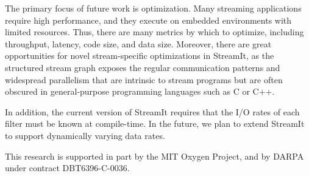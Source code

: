  The primary focus of future work is
optimization.  Many streaming applications require high performance,
and they execute on embedded environments with limited resources.
Thus, there are many metrics by which to optimize, including
throughput, latency, code size, and data size.  Moreover, there are
great opportunities for novel stream-specific optimizations in
StreamIt, as the structured stream graph exposes the regular
communication patterns and widespread parallelism that are intrinsic
to stream programs but are often obscured in general-purpose
programming languages such as C or C++.

In addition, the current version of StreamIt requires that the I/O
rates of each filter must be known at compile-time.  In the future, we
plan to extend StreamIt to support dynamically varying data rates.

This research is supported in part by the MIT Oxygen Project, and by
DARPA under contract DBT6396-C-0036.

%
%
% 

